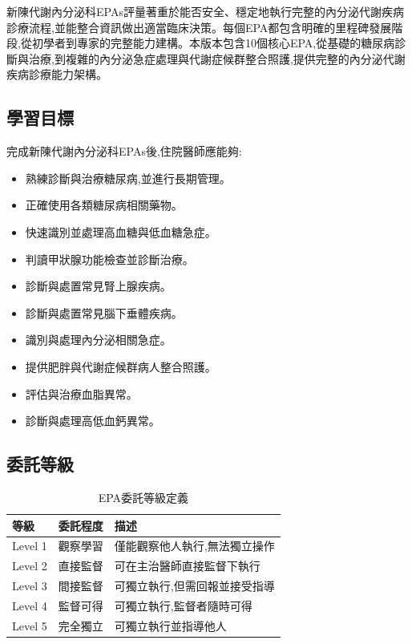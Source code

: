 \documentclass[12pt,a4paper]{article}
\newcommand{\note}[1]{
    \par
    \noindent
    \begin{tcolorbox}[
        colback=endo_teal!5!white,
        colframe=endo_teal,
        title=\textbf{重點提醒},
        fonttitle=\bfseries,
        boxrule=0.5pt,
        arc=3pt,
        left=6pt,
        right=6pt,
        top=6pt,
        bottom=6pt
    ]
    #1
    \end{tcolorbox}
}
\begin{document}
\vspace{0.5cm}
\note{
新陳代謝內分泌科EPAs評量著重於能否安全、穩定地執行完整的內分泌代謝疾病診療流程,並能整合資訊做出適當臨床決策。每個EPA都包含明確的里程碑發展階段,從初學者到專家的完整能力建構。本版本包含10個核心EPA,從基礎的糖尿病診斷與治療,到複雜的內分泌急症處理與代謝症候群整合照護,提供完整的內分泌代謝疾病診療能力架構。
}

\subsection{學習目標}
完成新陳代謝內分泌科EPAs後,住院醫師應能夠:
\begin{itemize}[nosep]
    \item 熟練診斷與治療糖尿病,並進行長期管理。
    \item 正確使用各類糖尿病相關藥物。
    \item 快速識別並處理高血糖與低血糖急症。
    \item 判讀甲狀腺功能檢查並診斷治療。
    \item 診斷與處置常見腎上腺疾病。
    \item 診斷與處置常見腦下垂體疾病。
    \item 識別與處理內分泌相關急症。
    \item 提供肥胖與代謝症候群病人整合照護。
    \item 評估與治療血脂異常。
    \item 診斷與處理高低血鈣異常。
\end{itemize}

\subsection{委託等級}
\begin{table}[h]
    \centering
    \caption{EPA委託等級定義}
    \begin{tabular}{p{2cm} p{3cm} p{9cm}}
        \toprule
        \textbf{等級} & \textbf{委託程度} & \textbf{描述} \\
        \midrule
        Level 1 & 觀察學習 & 僅能觀察他人執行,無法獨立操作 \\
        Level 2 & 直接監督 & 可在主治醫師直接監督下執行 \\
        Level 3 & 間接監督 & 可獨立執行,但需回報並接受指導 \\
        Level 4 & 監督可得 & 可獨立執行,監督者隨時可得 \\
        Level 5 & 完全獨立 & 可獨立執行並指導他人 \\
        \bottomrule
    \end{tabular}
\end{table}
\end{document}
